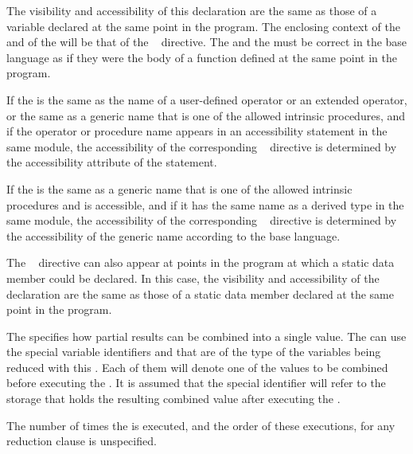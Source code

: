 The visibility and accessibility of this declaration are the same as those 
of a variable declared at the same point in the program. The enclosing context 
of the  and of the  will be that of the 
~ directive. The  and the 
 must be correct in the base language as if they were 
the body of a function defined at the same point in the program.

\begin{fortranspecific}
If the  is the same as the name of a user-defined 
operator or an extended operator, or the same as a generic name that is one 
of the allowed intrinsic procedures, and if the operator or procedure name 
appears in an accessibility statement in the same module, the accessibility 
of the corresponding ~ directive is determined 
by the accessibility attribute of the statement.

If the  is the same as a generic name that is one 
of the allowed intrinsic procedures and is accessible, and if it has the same 
name as a derived type in the same module, the accessibility of the corresponding 
~ directive is determined by the accessibility 
of the generic name according to the base language.
\end{fortranspecific}

\begin{cppspecific}
The ~ directive can also appear at points in the 
program at which a static data member could be declared. In this case, the 
visibility and accessibility of the declaration are the same as those of a 
static data member declared at the same point in the program.
\end{cppspecific}

The  specifies how partial results can be combined into a single 
value. The  can use the special variable identifiers  
and  that are of the type of the variables being reduced with this 
. Each of them will denote one of the values to be 
combined before executing the . It is assumed that the special 
 identifier will refer to the storage that holds the resulting
combined value after executing the .

The number of times the  is executed, and the order of these 
executions, for any reduction clause is unspecified.

